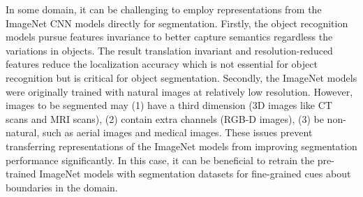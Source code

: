 
In some domain, it can be challenging to employ representations from the ImageNet CNN models directly for segmentation.
Firstly, the object recognition models pursue features invariance to better capture semantics regardless the variations in objects.
The result translation invariant and resolution-reduced features reduce the localization accuracy which is not essential for object recognition but is critical for object segmentation. \cite{zheng2015conditional,chen2016deeplab}
Secondly, the ImageNet models were originally trained with natural images at relatively low resolution.
However, images to be segmented may (1) have a third dimension (3D images like CT scans and MRI scans), (2) contain extra channels (RGB-D images),  (3) be non-natural, such as aerial images and medical images.
These issues prevent transferring representations of the ImageNet models from improving segmentation performance significantly.
In this case, it can be beneficial to retrain the pre-trained ImageNet models with segmentation datasets for fine-grained cues about boundaries in the domain.





